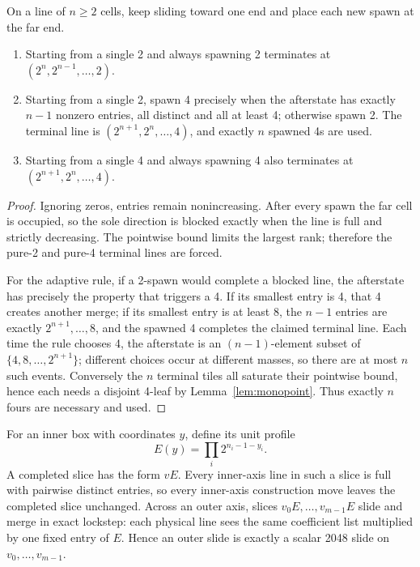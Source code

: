 \begin{lemma}\label{lem:monocounter}
On a line of $n\ge2$ cells, keep sliding toward one end and place each
new spawn at the far end.
\begin{enumerate}[nosep,label=(\roman*)]
\item Starting from a single 2 and always spawning 2 terminates at
$(2^n,2^{n-1},\ldots,2)$.
\item Starting from a single 2, spawn 4 precisely when the afterstate has
exactly $n-1$ nonzero entries, all distinct and all at least 4; otherwise
spawn 2.  The terminal line is $(2^{n+1},2^n,\ldots,4)$, and exactly $n$
spawned 4s are used.
\item Starting from a single 4 and always spawning 4 also terminates at
$(2^{n+1},2^n,\ldots,4)$.
\end{enumerate}
\end{lemma}
\begin{proof}
Ignoring zeros, entries remain nonincreasing.  After every spawn the far
cell is occupied, so the sole direction is blocked exactly when the line
is full and strictly decreasing.  The pointwise bound limits the largest
rank; therefore the pure-2 and pure-4 terminal lines are forced.

For the adaptive rule, if a 2-spawn would complete a blocked line, the
afterstate has precisely the property that triggers a 4.  If its smallest
entry is 4, that 4 creates another merge; if its smallest entry is at
least 8, the $n-1$ entries are exactly $2^{n+1},\ldots,8$, and the spawned
4 completes the claimed terminal line.  Each time the rule chooses 4, the
afterstate is an $(n-1)$-element subset of
$\{4,8,\ldots,2^{n+1}\}$; different choices occur at different masses, so
there are at most $n$ such events.  Conversely the $n$ terminal tiles all
saturate their pointwise bound, hence each needs a disjoint 4-leaf by
Lemma~\ref{lem:monopoint}.  Thus exactly $n$ fours are necessary and used.
\end{proof}

For an inner box with coordinates $y$, define its unit profile
\[
 E(y)=\prod_i2^{n_i-1-y_i}.
\]
A completed slice has the form $vE$.  Every inner-axis line in such a
slice is full with pairwise distinct entries, so every inner-axis
construction move leaves the completed slice unchanged.  Across an outer
axis, slices $v_0E,\ldots,v_{m-1}E$ slide and merge in exact lockstep:
each physical line sees the same coefficient list multiplied by one fixed
entry of $E$.  Hence an outer slide is exactly a scalar 2048 slide on
$v_0,\ldots,v_{m-1}$.

